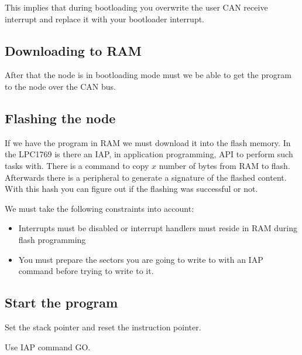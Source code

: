 \documentclass[twocolumn]{article}
\begin{document}
			This implies that during bootloading you overwrite the user CAN receive interrupt and replace it with your bootloader interrupt.
	
	\subsection*{Downloading to RAM}
		After that the node is in bootloading mode must we be able to get the program to the node over the CAN bus.
		
	
	\subsection*{Flashing the node}
		If we have the program in RAM we must download it into the flash memory.
		In the LPC1769 is there an IAP, in application programming, API to perform such tasks with.
		There is a command to copy $x$ number of bytes from RAM to flash.
		Afterwards there is a peripheral to generate a signature of the flashed content.
		With this hash you can figure out if the flashing was successful or not.
		
		We must take the following constraints into account:
		\begin{itemize}
			\item Interrupts must be disabled or interrupt handlers must reside in RAM during flash programming
			\item You must prepare the sectors you are going to write to with an IAP command before trying to write to it.
		\end{itemize}
	
	\subsection*{Start the program}
		Set the stack pointer and reset the instruction pointer.
		
		Use IAP command GO.
	
	
	
	
	
	
	
\end{document}
